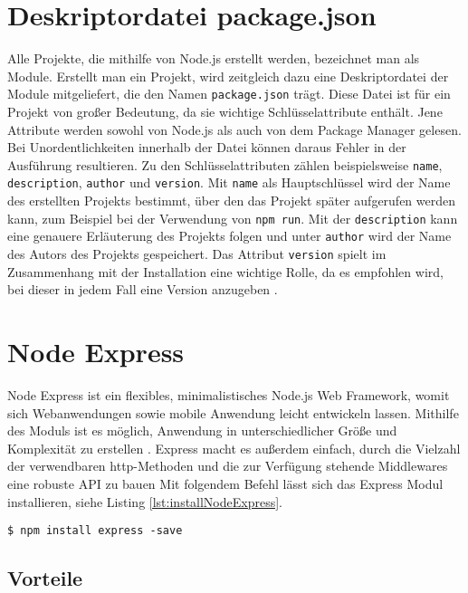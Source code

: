 \section{Deskriptordatei package.json}
Alle Projekte, die mithilfe von Node.js erstellt werden, bezeichnet man als Module. Erstellt man ein Projekt, wird zeitgleich dazu eine Deskriptordatei der Module mitgeliefert, die den Namen \texttt{package.json} trägt. Diese Datei ist für ein Projekt von großer Bedeutung, da sie wichtige Schlüsselattribute enthält. Jene Attribute werden sowohl von Node.js als auch von dem Package Manager gelesen. Bei Unordentlichkeiten innerhalb der Datei können daraus Fehler in der Ausführung resultieren. 
Zu den Schlüsselattributen zählen beispielsweise \texttt{name}, \texttt{description}, \texttt{author} und \texttt{version}. Mit \texttt{name} als Hauptschlüssel wird der Name des erstellten Projekts bestimmt, über den das Projekt später aufgerufen werden kann, zum Beispiel bei der Verwendung von \texttt{npm run}. Mit der \texttt{description} kann eine genauere Erläuterung des Projekts folgen und unter \texttt{author} wird der Name des Autors des Projekts gespeichert. Das Attribut \texttt{version} spielt im Zusammenhang mit der Installation eine wichtige Rolle, da es empfohlen wird, bei dieser in jedem Fall eine Version anzugeben \cite[S.10f.]{neins}. 

\section{Node Express}

Node Express ist ein flexibles, minimalistisches Node.js Web Framework, womit sich Webanwendungen sowie mobile Anwendung leicht entwickeln lassen. Mithilfe des Moduls ist es möglich, Anwendung in unterschiedlicher Größe und Komplexität zu erstellen \cite[S.16]{neins}. Express macht es außerdem einfach, durch die Vielzahl der verwendbaren http-Methoden und die zur Verfügung stehende Middlewares eine robuste API zu bauen \cite{ndrei}
Mit folgendem Befehl lässt sich das Express Modul installieren, siehe Listing \ref*{lst:installNodeExpress}.

\begin{lstlisting}[caption={Express Modul installieren}, label={lst:installNodeExpress}]
    $ npm install express -save
\end{lstlisting}


\subsection{Vorteile}

